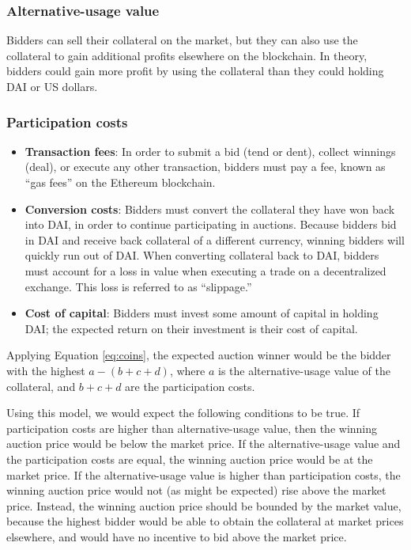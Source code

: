\documentclass[conference]{IEEEtran}
\begin{document}
\subsubsection{Alternative-usage value} Bidders can sell their collateral on the market, but they can also use the collateral to gain additional profits elsewhere on the blockchain. In theory, bidders could gain more profit by using the collateral than they could holding DAI or US dollars.
\subsubsection{Participation costs}
\begin{itemize}[leftmargin=.4in]
    \item \textbf{Transaction fees}: In order to submit a bid (tend or dent), collect winnings (deal), or execute any other transaction, bidders must pay a fee, known as ``gas fees'' on the Ethereum blockchain.
    \item \textbf{Conversion costs}: Bidders must convert the collateral they have won back into DAI, in order to continue participating in auctions. Because bidders bid in DAI and receive back collateral of a different currency, winning bidders will quickly run out of DAI. When converting collateral back to DAI, bidders must account for a loss in value when executing a trade on a decentralized exchange. This loss is referred to as ``slippage.''
    \item \textbf{Cost of capital}: Bidders must invest some amount of capital in holding DAI; the expected return on their investment is their cost of capital.
\end{itemize}

Applying Equation \eqref{eq:coins}, the expected auction winner would be the bidder with the highest $a - (b + c + d)$, where $a$ is the alternative-usage value of the collateral, and $b + c + d$ are the participation costs. 

Using this model, we would expect the following conditions to be true. If participation costs are higher than alternative-usage value, then the winning auction price would be below the market price. If the alternative-usage value and the participation costs are equal, the winning auction price would be at the market price. If the alternative-usage value is higher than participation costs, the winning auction price would not (as might be expected) rise above the market price. Instead, the winning auction price should be bounded by the market value, because the highest bidder would be able to obtain the collateral at market prices elsewhere, and would have no incentive to bid above the market price.
\end{document}
